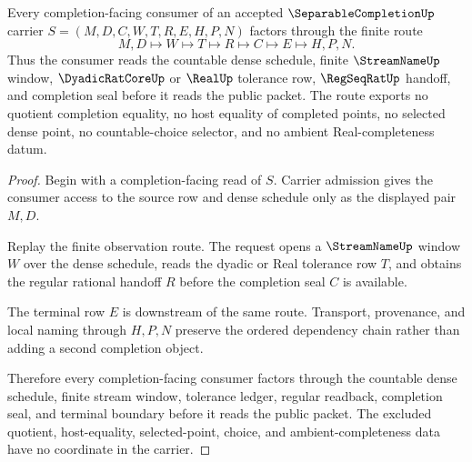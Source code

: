 \begin{theorem}\label{thm:separable-completion-density-handoff}
Every completion-facing consumer of an accepted $\SeparableCompletionUp$ carrier $S=(M,D,C,W,T,R,E,H,P,N)$ factors through the finite route
$$
M,D \longmapsto W \longmapsto T \longmapsto R \longmapsto C \longmapsto E \longmapsto H,P,N .
$$
Thus the consumer reads the countable dense schedule, finite $\StreamNameUp$ window, $\DyadicRatCoreUp$ or $\RealUp$ tolerance row, $\RegSeqRatUp$ handoff, and completion seal before it reads the public packet. The route exports no quotient completion equality, no host equality of completed points, no selected dense point, no countable-choice selector, and no ambient Real-completeness datum.
\end{theorem}
\begin{proof}
Begin with a completion-facing read of $S$. Carrier admission gives the consumer access to the source row and dense schedule only as the displayed pair $M,D$.

Replay the finite observation route. The request opens a $\StreamNameUp$ window $W$ over the dense schedule, reads the dyadic or Real tolerance row $T$, and obtains the regular rational handoff $R$ before the completion seal $C$ is available.

The terminal row $E$ is downstream of the same route. Transport, provenance, and local naming through $H,P,N$ preserve the ordered dependency chain rather than adding a second completion object.

Therefore every completion-facing consumer factors through the countable dense schedule, finite stream window, tolerance ledger, regular readback, completion seal, and terminal boundary before it reads the public packet. The excluded quotient, host-equality, selected-point, choice, and ambient-completeness data have no coordinate in the carrier.
\end{proof}

